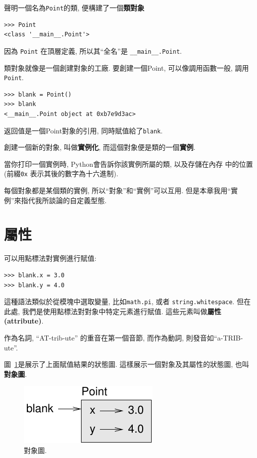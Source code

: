 \documentclass[10pt]{book}
\begin{document}
聲明一個名為{\tt Point}的類, 便構建了一個{\bf 類對象}

\begin{verbatim}
>>> Point
<class '__main__.Point'>
\end{verbatim}
%
因為 {\tt Point} 在頂層定義, 所以其``全名''是 \verb"__main__.Point".

類對象就像是一個創建對象的工廠. 
要創建一個Point,  可以像調用函數一般, 調用{\tt Point}.

\begin{verbatim}
>>> blank = Point()
>>> blank
<__main__.Point object at 0xb7e9d3ac>
\end{verbatim}
%
返回值是一個Point對象的引用, 同時賦值給了{\tt blank}.  

創建一個新的對象, 叫做{\bf 實例化}, 
而這個對象便是類的一個{\bf 實例}. 

當你打印一個實例時, Python會告訴你該實例所屬的類, 以及存儲在內存
中的位置(前綴{\tt 0x} 表示其後的數字為十六進制).

每個對象都是某個類的實例, 所以``對象''和``實例''可以互用. 
但是本章我用``實例''來指代我所談論的自定義型態. 


\section{屬性}
\label{attributes}
可以用點標法對實例進行賦值:

\begin{verbatim}
>>> blank.x = 3.0
>>> blank.y = 4.0
\end{verbatim}
%

這種語法類似於從模塊中選取變量, 比如{\tt math.pi}, 或者 {\tt string.whitespace}. 
但在此處, 我們是使用點標法對對象中特定元素進行賦值. 
這些元素叫做{\bf 屬性(attribute)}. 

作為名詞, ``AT-trib-ute'' 的重音在第一個音節, 而作為動詞,  則發音如``a-TRIB-ute''. 

圖~\ref{fig.point}是展示了上面賦值結果的狀態圖. 
這樣展示一個對象及其屬性的狀態圖, 也叫{\bf 對象圖}. 

\begin{figure}
\centerline
{\includegraphics[scale=0.8]{figs/point.pdf}}
\caption{對象圖.}
\label{fig.point}
\end{figure}
\end{document}
